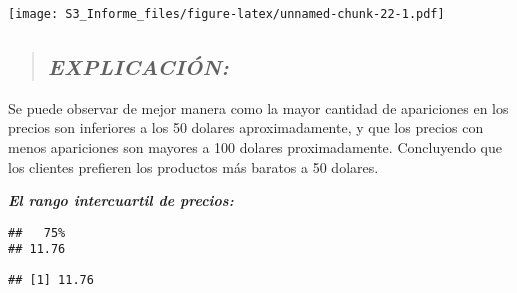 \documentclass[
]{article}
\newenvironment{Shaded}{\begin{snugshade}}{\end{snugshade}}
\newcommand{\AttributeTok}[1]{\textcolor[rgb]{0.77,0.63,0.00}{#1}}
\newcommand{\CommentTok}[1]{\textcolor[rgb]{0.56,0.35,0.01}{\textit{#1}}}
\newcommand{\FloatTok}[1]{\textcolor[rgb]{0.00,0.00,0.81}{#1}}
\newcommand{\FunctionTok}[1]{\textcolor[rgb]{0.00,0.00,0.00}{#1}}
\newcommand{\NormalTok}[1]{#1}
\newcommand{\OtherTok}[1]{\textcolor[rgb]{0.56,0.35,0.01}{#1}}
\newcommand{\SpecialCharTok}[1]{\textcolor[rgb]{0.00,0.00,0.00}{#1}}
\newcommand{\StringTok}[1]{\textcolor[rgb]{0.31,0.60,0.02}{#1}}
\begin{document}
\texttt{[image: S3\_Informe\_files/figure-latex/unnamed-chunk-22-1.pdf]}

\begin{quote}
\hypertarget{explicaciuxf3n-4}{%
\subsection{\texorpdfstring{\textbf{\emph{EXPLICACIÓN:}}}{EXPLICACIÓN:}}\label{explicaciuxf3n-4}}
\end{quote}

Se puede observar de mejor manera como la mayor cantidad de apariciones
en los precios son inferiores a los 50 dolares aproximadamente, y que
los precios con menos apariciones son mayores a 100 dolares
proximadamente. Concluyendo que los clientes prefieren los productos más
baratos a 50 dolares.

\textbf{\emph{El rango intercuartil de precios:}}

\begin{Shaded}
\end{Shaded}

\begin{verbatim}
##   75% 
## 11.76
\end{verbatim}

\begin{Shaded}
\end{Shaded}

\begin{verbatim}
## [1] 11.76
\end{verbatim}

\begin{Shaded}
\end{Shaded}
\end{document}
